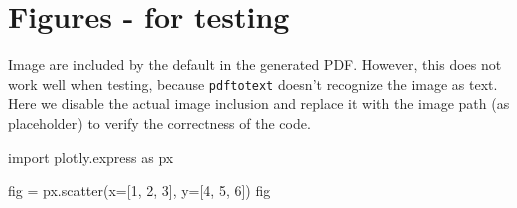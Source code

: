 \documentclass[oneside]{book}
\begin{document}
\chapter{Figures - for testing}

Image are included by the default in the generated PDF. However, this does not work well when testing, because \texttt{pdftotext} doesn't recognize the image as text. Here we disable the actual image inclusion and replace it with the image path (as placeholder) to verify the correctness of the code.

\begin{pycell}
import plotly.express as px

fig = px.scatter(x=[1, 2, 3], y=[4, 5, 6])
fig
\end{pycell}
\ifPythonTeXLoaded
{}
\else
\fi
\end{document}
